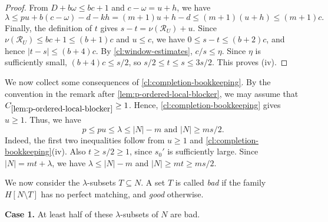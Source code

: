 \documentclass[10pt,a4paper]{article}
\numberwithin{equation}{section}
\theoremstyle{definition}
\newcommand{\Rcal}{\mathcal R}
\begin{document}
\begin{proof}
        From $D+b\omega\le bc+1$ and
        $c-\omega=u+h$, we have
        \[
                \lambda\le
                pu+b(c-\omega)-d-kh=
                (m+1)u+h-d\le
                (m+1)(u+h)
                \le(m+1)c.
        \]
        Finally, the definition of $t$ gives
        $s-t=\nu(\Rcal_U)+u$.
        Since $\nu(\Rcal_U)\le bc+1\le(b+1)c$ and $u\le c$, we have
        $0\le s-t\le(b+2)c$, and hence
        $|t-s|\le(b+4)c$.
        By \cref{cl:window-estimates}, $c/s\le\eta$.
        Since $\eta$ is sufficiently small, $(b+4)c\le s/2$, so
        $s/2\le t\le s\le3s/2$.
        This proves (iv).
\end{proof}

We now collect some consequences of \cref{cl:completion-bookkeeping}.
By the convention in the remark after \cref{lem:p-ordered-local-blocker}, we may assume that $C_{\ref{lem:p-ordered-local-blocker}}\ge1$.
Hence, \cref{cl:completion-bookkeeping} gives $u\ge1$.
Thus, we have
\begin{equation}\label{eq:completion-feasibility}
        p\le pu\le\lambda\le |N|-m \text{ and }
        |N|\ge ms/2.
\end{equation}
Indeed, the first two inequalities follow from $u\ge1$ and \cref{cl:completion-bookkeeping}(iv).
Also $t\ge s/2\ge1$, since $s_0'$ is sufficiently large.
Since $|N|=mt+\lambda$, we have $\lambda\le |N|-m$ and $|N|\ge mt\ge ms/2$.

We now consider the $\lambda$-subsets $T\subseteq N$.
A set $T$ is called \emph{bad} if the family $H[N\setminus T]$ has no perfect matching, and \emph{good} otherwise.



\medskip\noindent\textbf{Case 1.} At least half of these $\lambda$-subsets of $N$ are bad.
\medskip
\end{document}
